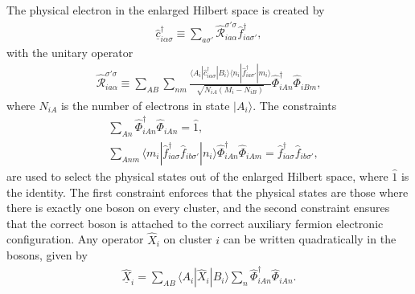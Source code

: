 \documentclass[reprint,aps,prb,amsmath,amssymb]{revtex4-2}
\begin{document}
The physical electron in the enlarged Hilbert space is created by
%
\begin{align}
\underline{\hat{c}}_{i\alpha\sigma}^{\dagger} \equiv \sum_{a\sigma'} \hat{\mathcal{R}}_{ia\alpha}^{\sigma' \sigma} \hat{f}_{ia\sigma'}^{\dagger},
\end{align}
%
with the unitary operator
%
\begin{align} \label{eq:R}
\hat{\mathcal{R}}_{ia\alpha}^{\sigma'\sigma} \equiv \sum_{AB} \sum_{nm} \frac{\langle A_i| \hat{c}_{i\alpha\sigma}^{\dagger} | B_i \rangle \langle n_i | \hat{f}_{ia\sigma'}^{\dagger} | m_i \rangle }{\sqrt{N_{iA}(M_i - N_{iB})}} \hat{\Phi}_{iAn}^{\dagger} \hat{\Phi}_{iBm}^{},
\end{align}
%
where $N_{iA}$ is the number of electrons in state $|A_i \rangle$. The constraints
%
\begin{align}
\label{eq:constraint1}
& \sum_{An} \hat{\Phi}_{iAn}^{\dagger} \hat{\Phi}_{iAn}^{} = \hat{1}, \\
%
\label{eq:constraint2}
& \sum_{Anm} \langle m_i | \hat{f}_{ia\sigma}^{\dagger} \hat{f}_{ib\sigma'}^{} |n_i \rangle \hat{\Phi}_{iAn}^{\dagger} \hat{\Phi}_{iAm}^{} = \hat{f}_{ia\sigma}^{\dagger} \hat{f}_{ib\sigma'}^{},
\end{align}
%
are used to select the physical states out of the enlarged Hilbert space, where $\hat{1}$ is the identity. The first constraint enforces that the physical states are those where there is exactly one boson on every cluster, and the second constraint ensures that the correct boson is attached to the correct auxiliary fermion electronic configuration. Any operator $\hat{X}_i$ on cluster $i$ can be written quadratically in the bosons, given by
%
\begin{align} \label{eq:local-op-bosons}
\underline{\hat{X}}_i = \sum_{AB} \langle A_i | \hat{X}_i | B_i \rangle \sum_n \hat{\Phi}_{iAn}^{\dagger} \hat{\Phi}_{iAn}^{}.
\end{align}
\end{document}
